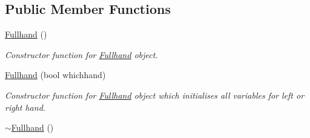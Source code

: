 \subsection*{Public Member Functions}
\begin{DoxyCompactItemize}
\item 
\hypertarget{classFullhand_a378dc2811c5d503a5227d7085931549a}{
\hyperlink{classFullhand_a378dc2811c5d503a5227d7085931549a}{Fullhand} ()}
\label{classFullhand_a378dc2811c5d503a5227d7085931549a}

\begin{DoxyCompactList}\small\item\em Constructor function for \hyperlink{classFullhand}{Fullhand} object. \end{DoxyCompactList}\item 
\hyperlink{classFullhand_a6e457a92117b68cd19d643f2152d7224}{Fullhand} (bool whichhand)
\begin{DoxyCompactList}\small\item\em Constructor function for \hyperlink{classFullhand}{Fullhand} object which initialises all variables for left or right hand. \end{DoxyCompactList}\item 
\hypertarget{classFullhand_a23ca737334a9fafce3010341d8890d45}{
\hyperlink{classFullhand_a23ca737334a9fafce3010341d8890d45}{$\sim$Fullhand} ()}
\label{classFullhand_a23ca737334a9fafce3010341d8890d45}


\end{DoxyCompactItemize}
